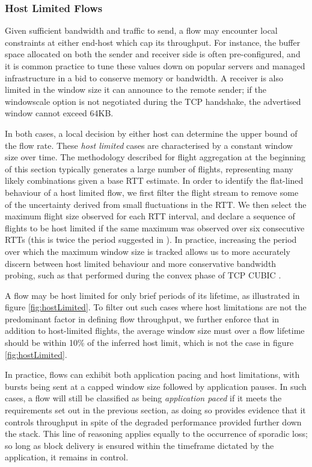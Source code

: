 \subsubsection{Host Limited Flows}
\label{sssec:host}

Given sufficient bandwidth and traffic to send, a flow may encounter local constraints at either end-host which cap its throughput. 
For instance, the buffer space allocated on both the sender and receiver side is often pre-configured, and it is common practice to tune these values down on popular servers and managed infrastructure in a bid to conserve memory or bandwidth.
A receiver is also limited in the window size it can announce to the remote sender; if the windowscale option \cite{jacobson1992tcp} is not negotiated during the TCP handshake, the advertised window cannot exceed 64KB.

In both cases, a local decision by either host can determine the upper bound of the flow rate.
These \emph{host limited} cases are characterised by a constant window size over time.
The methodology described for flight aggregation at the beginning of this section typically generates a large number of flights, representing many likely combinations given a base RTT estimate.
In order to identify the flat-lined behaviour of a host limited flow, we first filter the flight stream to remove some of the uncertainty derived from small fluctuations in the RTT.
We then select the maximum flight size observed for each RTT interval, and declare a sequence of flights to be host limited if the same maximum was observed over six consecutive RTTs (this is twice the period suggested in \cite{Zhang:2002p85}).
In practice, increasing the period over which the maximum window size is tracked allows us to more accurately discern between host limited behaviour and more conservative bandwidth probing, such as that performed during the convex phase of TCP CUBIC \cite{Ha:2008p471}.

A flow may be host limited for only brief periods of its lifetime, as illustrated in figure \ref{fig:hostLimited}.
To filter out such cases where host limitations are not the predominant factor in defining flow throughput, we further enforce that in addition to host-limited flights, the average window size must over a flow lifetime should be within 10\% of the inferred host limit, which is not the case in figure \ref{fig:hostLimited}.

In practice, flows can exhibit both application pacing and host limitations, with bursts being sent at a capped window size followed by application pauses.
In such cases, a flow will still be classified as being \emph{application paced} if it meets the requirements set out in the previous section, as doing so provides evidence that it controls throughput in spite of the degraded performance provided further down the stack. 
This line of reasoning applies equally to the occurrence of sporadic loss; so long as block delivery is ensured within the timeframe dictated by the application, it remains in control.

